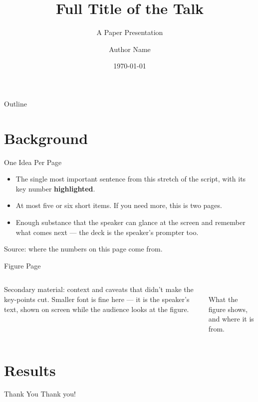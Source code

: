 \documentclass[aspectratio=169,11pt]{beamer}
\title[Short Title]{Full Title of the Talk}
\subtitle{A Paper Presentation}
\author[Author]{Author Name}
\institute[Institute Short]{Institute Full Name}
\date{\today}
\newcommand{\hl}[1]{{\color{MediumBlue}\bfseries #1}}
\newcommand{\srcnote}[1]{{\tiny\color{gray} #1}}
\begin{document}
\maketitle

\begin{frame}{Outline}
  \tableofcontents
\end{frame}

\section{Background}

\begin{frame}{One Idea Per Page}
  \begin{itemize}
    \setlength{\itemsep}{6pt}
    \item The single most important sentence from this stretch of the script,
          with its key number \hl{highlighted}.
    \item At most five or six short items. If you need more, this is two pages.
    \item Enough substance that the speaker can glance at the screen and
          remember what comes next — the deck is the speaker's prompter too.
  \end{itemize}
  \vfill
  \srcnote{Source: where the numbers on this page come from.}
\end{frame}

\begin{frame}{Figure Page}
  \begin{columns}[T]
      {\small Secondary material: context and caveats that didn't make the
       key-points cut. Smaller font is fine here — it is the speaker's text,
       shown on screen while the audience looks at the figure.\par}
      \centering
      \\[2pt]
      \srcnote{What the figure shows, and where it is from.}
  \end{columns}
\end{frame}

\section{Results}

\begin{frame}{Thank You}
  \centering\Large Thank you!
\end{frame}
\end{document}
